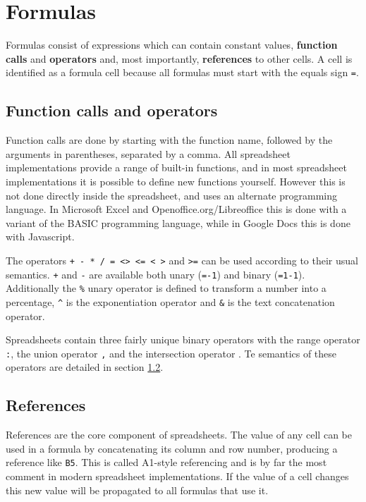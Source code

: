 \documentclass[12pt,a4paper,onecolumn,oneside]{memoir}
\newcommand{\f}[1]{\texttt{#1}}
\newcommand{\key}[1]{\textbf{#1}}
\begin{document}
\section{Formulas}

Formulas consist of expressions which can contain constant values, \key{function calls} and \key{operators} and, most importantly, \key{references} to other cells.
A cell is identified as a formula cell because all formulas must start with the equals sign \f{=}.

\subsection{Function calls and operators}

Function calls are done by starting with the function name, followed by the arguments in parentheses, separated by a comma.
All spreadsheet implementations provide a range of built-in functions, and in most spreadsheet implementations it is possible to define new functions yourself.
However this is not done directly inside the spreadsheet, and uses an alternate programming language.
In Microsoft Excel and Openoffice.org/Libreoffice this is done with a variant of the BASIC programming language, while in Google Docs this is done with Javascript.

The operators \f{+ - * / = <> <= < >} and \f{>=} can be used according to their usual semantics.
\f{+} and \f{-} are available both unary (\f{=-1}) and binary (\f{=1-1}).
Additionally the \f{\%} unary operator is defined to transform a number into a percentage, \f{\^} is the exponentiation operator and \f{\&} is the text concatenation operator.

Spreadsheets contain three fairly unique binary operators with the range operator \f{:}, the union operator \f{,} and the intersection operator \f{}.
Te semantics of these operators are detailed in section \ref{sec:references}.

\subsection{References}
\label{sec:references}
References are the core component of spreadsheets.
The value of any cell can be used in a formula by concatenating its column and row number, producing a reference like \f{B5}.
This is called A1-style referencing and is by far the most comment in modern spreadsheet implementations.
If the value of a cell changes this new value will be propagated to all formulas that use it.
\end{document}
